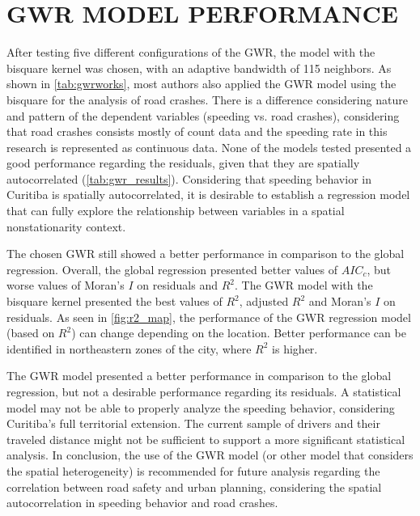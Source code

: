 \section{GWR MODEL PERFORMANCE} \label{sec:gwr_perf}



After testing five different configurations of the GWR, the model with the bisquare kernel was chosen, with an adaptive bandwidth of 115 neighbors. As shown in \autoref{tab:gwrworks}, most authors also applied the GWR model using the bisquare for the analysis of road crashes. There is a difference considering nature and pattern of the dependent variables (speeding vs. road crashes), considering that road crashes consists mostly of count data and the speeding rate in this research is represented as continuous data. None of the models tested presented a good performance regarding the residuals, given that they are spatially autocorrelated (\autoref{tab:gwr_results}). Considering that speeding behavior in Curitiba is spatially autocorrelated, it is desirable to establish a regression model that can fully explore the relationship between variables in a spatial nonstationarity context. 

The chosen GWR still showed a better performance in comparison to the global regression. Overall, the global regression presented better values of $AIC_c$, but worse values of Moran's $I$ on residuals and $R^2$. The GWR model with the bisquare kernel presented the best values of $R^2$, adjusted $R^2$ and Moran's $I$ on residuals. As seen in \autoref{fig:r2_map}, the performance of the GWR regression model (based on $R^2$) can change depending on the location. Better performance can be identified in northeastern zones of the city, where $R^2$ is higher. 

The GWR model presented a better performance in comparison to the global regression, but not a desirable performance regarding its residuals. A statistical model may not be able to properly analyze the speeding behavior, considering Curitiba's full territorial extension. The current sample of drivers and their traveled distance might not be sufficient to support a more significant statistical analysis. In conclusion, the use of the GWR model (or other model that considers the spatial heterogeneity) is recommended for future analysis regarding the correlation between road safety and urban planning, considering the spatial autocorrelation in speeding behavior and road crashes. 

